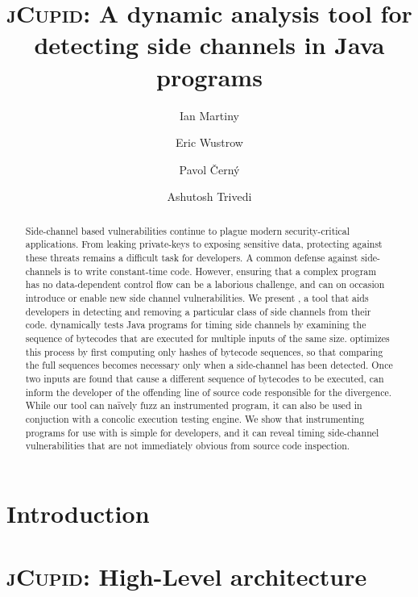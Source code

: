 \documentclass{llncs}
\begin{document}
\title{\textsc{jCupid}: A dynamic analysis tool for detecting side channels in
  Java programs}
\author{
  Ian Martiny
  \and
  Eric Wustrow
  \and
  Pavol {\v C}ern\'y
  \and
  Ashutosh Trivedi
}


\maketitle

\begin{abstract}
  Side-channel based vulnerabilities continue to plague modern security-critical
  applications.
  From leaking private-keys to exposing sensitive data, 
  protecting against these threats remains a difficult task for developers. 
  A common defense against side-channels is to write constant-time code.
  However, ensuring that a complex program has no data-dependent control flow
  can be a laborious challenge, and can on occasion introduce or enable new side
  channel vulnerabilities.
  We present \jcupid, a tool that aids developers in detecting and
  removing a particular class of side channels from their code.
  \jcupid dynamically tests Java programs for timing side channels by examining
  the sequence of bytecodes that are executed for multiple inputs of the same size.
  \jcupid optimizes this process by first computing only hashes of bytecode sequences,
  so that comparing the full sequences becomes necessary only when a side-channel has been detected.
  Once two inputs are found that cause a different sequence of bytecodes to be
  executed, \jcupid can inform the developer of the offending line of source code
  responsible for the divergence.
  While our tool can na\"ively fuzz an instrumented program, it can also be used
  in conjuction with a concolic execution testing engine.
  We show that instrumenting programs for use with \jcupid is simple for
  developers, and it can reveal timing side-channel vulnerabilities
  that are not immediately obvious from source code inspection.
\end{abstract}



\section{Introduction}
\label{sec:introduction}



\section{\textsc{jCupid}: High-Level architecture}
\label{sec:jcupid}

\end{document}
